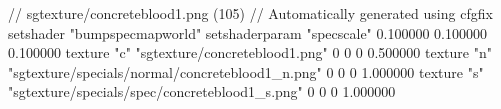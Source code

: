 // sgtexture/concreteblood1.png (105)
// Automatically generated using cfgfix
setshader "bumpspecmapworld"
setshaderparam "specscale" 0.100000 0.100000 0.100000
texture "c" "sgtexture/concreteblood1.png" 0 0 0 0.500000
texture "n" "sgtexture/specials/normal/concreteblood1_n.png" 0 0 0 1.000000
texture "s" "sgtexture/specials/spec/concreteblood1_s.png" 0 0 0 1.000000
